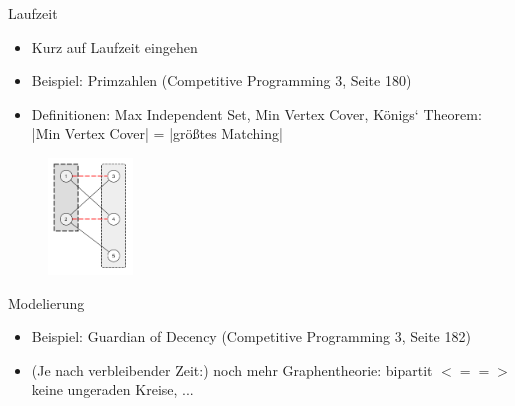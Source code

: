 \documentclass[18pt]{beamer}
\begin{document}
\begin{frame}{Laufzeit}
	\begin{itemize}
		\item Kurz auf Laufzeit eingehen
		\item Beispiel: Primzahlen (Competitive Programming 3, Seite 180)
		\item Definitionen: Max Independent Set, Min Vertex Cover, K\"onigs‘ Theorem: |Min Vertex Cover| = |größtes Matching|
	\end{itemize}
	\begin{figure}
	\includegraphics[width = 0.2\textwidth] {img/TobiasT_Laufzeit.jpg}
	\end{figure}
\end{frame}

\begin{frame}{Modelierung}
	\begin{itemize}
		\item Beispiel: Guardian of Decency (Competitive Programming 3, Seite 182)
		\item (Je nach verbleibender Zeit:) noch mehr Graphentheorie: bipartit $< == >$ keine ungeraden Kreise, ...
	\end{itemize}
\end{frame}
\end{document}
